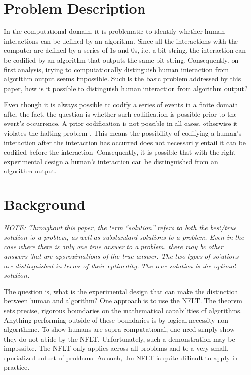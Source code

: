 \section{Problem Description}

In the computational domain, it is problematic to identify whether human interactions can be defined by an algorithm.  Since all the interactions with the computer are defined by a series of 1s and 0s, i.e. a bit string, the interaction can be codified by an algorithm that outputs the same bit string.  Consequently, on first analysis, trying to computationally distinguish human interaction from algorithm output seems impossible.  Such is the basic problem addressed by this paper, how is it possible to distinguish human interaction from algorithm output?

Even though it is always possible to codify a series of events in a finite domain after the fact, the question is whether such codification is possible prior to the event's occurrence.  A prior codification is not possible in all cases, otherwise it violates the halting problem \cite{cover06:_elemen_of_infor_theor}.  This means the possibility of codifying a human's interaction after the interaction has occurred does not necessarily entail it can be codified before the interaction.  Consequently, it is possible that with the right experimental design a human's interaction can be distinguished from an algorithm output.

\section{Background}\label{sec:background}

\emph{NOTE: Throughout this paper, the term ``solution'' refers to both the best/true solution to a problem, as well as substandard solutions to a problem.  Even in the case where there is only one true answer to a problem, there may be other answers that are approximations of the true answer.  The two types of solutions are distinguished in terms of their optimality.  The true solution is the optimal solution.}

The question is, what is the experimental design that can make the distinction between human and algorithm?  One approach is to use the NFLT.  The theorem sets precise, rigorous boundaries on the mathematical capabilities of algorithms. Anything performing outside of these boundaries is by logical necessity non-algorithmic.  To show humans are supra-computational, one need simply show they do not abide by the NFLT.  Unfortunately, such a demonstration may be impossible.  The NFLT only applies across all problems and to a very small, specialized subset of problems.  As such, the NFLT is quite difficult to apply in practice.


